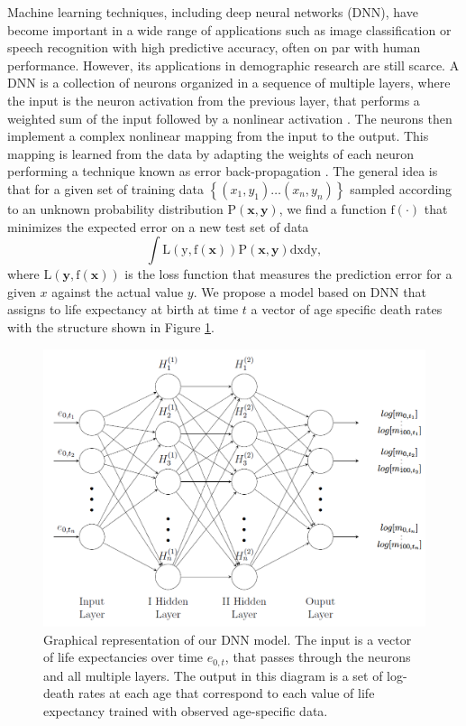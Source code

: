 \documentclass[a4,11pt]{article}
\begin{document}
Machine learning techniques, including deep neural networks (DNN), have become important in a wide range of applications such as image classification or speech recognition with high predictive accuracy, often on par with human performance. However, its applications in demographic research are still scarce. A DNN is a collection of neurons organized in a sequence of multiple layers, where the input is the neuron activation from the previous layer, that performs a weighted sum of the input followed by a nonlinear activation \citep{MONTAVON20181}. The neurons then implement a complex nonlinear mapping from the input to the output. This mapping is learned from the data by adapting the weights of each neuron performing a technique known as error back-propagation \citep{Rumelhart}. The general idea is that for a given set of training data $\left\{\left(x_{1},y_{1}\right) \ldots\left(x_{n},y_{n}\right)\right\}$ sampled according to an unknown probability distribution $\mathrm{P}(\mathbf{x}, 
 \mathbf{y})$, we find a function $\mathrm{f(\cdot)}$ that minimizes the expected error on a new test set of data
 $$
\int \mathrm{L}(\mathrm{y}, \mathrm{f}(\mathbf{x})) \mathrm{P}(\mathbf{x}, \mathbf{y}) \mathrm{d} \mathrm{x} \mathrm{dy},
$$
 where $\mathrm{L}(\mathbf{y}, \mathrm{f}(\mathbf{x}))$ is the loss function that measures the prediction error for a given $x$ against the actual value $y$. We propose a model based on DNN that assigns to life expectancy at birth at time $t$ a vector of age specific death rates with the structure shown in Figure \ref{fig:NN}.

\begin{figure}[H]
\centering
\includegraphics[width=0.8\linewidth]{NNmodel.png}
\caption{\footnotesize Graphical representation of our DNN model. The input is a vector of life expectancies over time $e_{0,t}$, that passes through the neurons and all multiple layers. The output in this diagram is a set of log-death rates at each age that correspond to each value of life expectancy trained with observed age-specific data.}
\label{fig:NN}
\end{figure}
\end{document}
